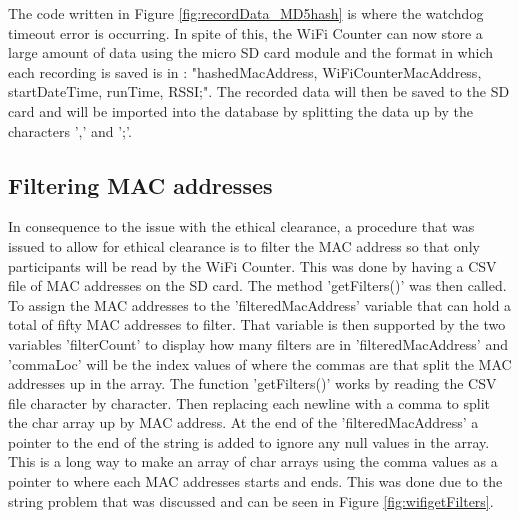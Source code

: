 \documentclass{report}
\begin{document}
The code written in Figure \ref{fig:recordData_MD5hash} is where the watchdog timeout error is occurring. In spite of this, the WiFi Counter can now store a large amount of data using the micro SD card module and the format in which each recording is saved is in : "hashedMacAddress, WiFiCounterMacAddress, startDateTime, runTime, RSSI;". The recorded data will then be saved to the SD card and will be imported into the database by splitting the data up by the characters ',' and ';'.
\subsection{Filtering MAC addresses}
In consequence to the issue with the ethical clearance, a procedure that was issued to allow for ethical clearance is to filter the MAC address so that only participants will be read by the WiFi Counter. This was done by having a CSV file of MAC addresses on the SD card. The method 'getFilters()' was then called. To assign the MAC addresses to the 'filteredMacAddress' variable that can hold a total of fifty MAC addresses to filter. That variable is then supported by the two variables 'filterCount' to display how many filters are in 'filteredMacAddress' and 'commaLoc' will be the index values of where the commas are that split the MAC addresses up in the array.  The function 'getFilters()' works by reading the CSV file character by character. Then replacing each newline with a comma to split the char array up by MAC address. At the end of the 'filteredMacAddress' a pointer to the end of the string is added to ignore any null values in the array. This is a long way to make an array of char arrays using the comma values as a pointer to where each MAC addresses starts and ends. This was done due to the string problem that was discussed and can be seen in Figure \ref{fig:wifigetFilters}. \\ \newline
\end{document}
